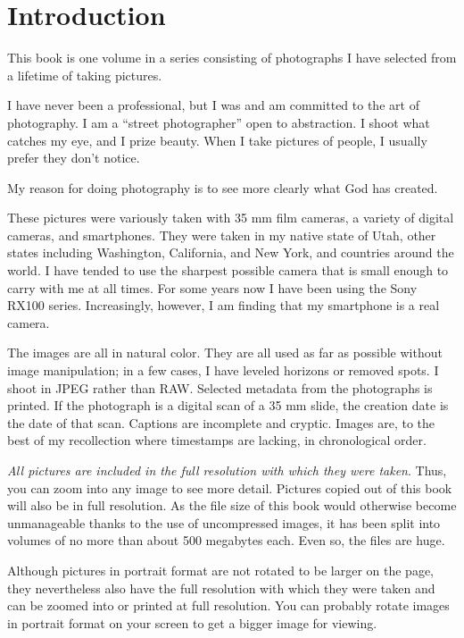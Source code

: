 \chapter{Introduction}

This book is one volume in a series consisting of photographs I have selected from a lifetime of taking pictures. 

I have never been a professional, but I was and am committed to the art of photography. I am a ``street photographer'' open to abstraction. I shoot what catches my eye, and I prize beauty. When I take pictures of people, I usually prefer they don't notice. 

My reason for doing photography is to see more clearly what God has created.

These pictures were variously taken with 35 mm film cameras, a variety of digital cameras, and smartphones. They were taken in my native state of Utah, other states including Washington, California, and New York, and countries around the world. I have tended to use the sharpest possible camera that is small enough to carry with me at all times. For some years now I have been using the Sony RX100 series. Increasingly, however, I am finding that my smartphone is a real camera.

The images are all in natural color. They are all used as far as possible without image manipulation; in a few cases, I have leveled horizons or removed spots. I shoot in JPEG rather than RAW. Selected metadata from the photographs is printed. If the photograph is a digital scan of a 35 mm slide, the creation date is the date of that scan. Captions are incomplete and cryptic. Images are, to the best of my recollection where timestamps are lacking, in chronological order.

\emph{All pictures are included in the full resolution with which they were taken}. Thus, you can zoom into any image to see more detail. Pictures copied out of this book will also be in full resolution. As the file size of this book would otherwise become unmanageable thanks to the use of uncompressed images, it has been split into volumes of no more than about 500 megabytes each. Even so, the files are huge. 

Although pictures in portrait format are not rotated to be larger on the page, they nevertheless also have the full resolution with which they were taken and can be zoomed into or printed at full resolution. You can probably rotate images in portrait format on your screen to get a bigger image for viewing.

